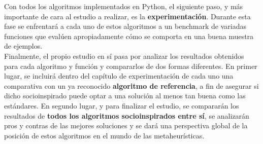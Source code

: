 Con todos los algoritmos implementados en Python, el siguiente paso, y más importante de cara al estudio a realizar, es la \textbf{experimentación}. Durante esta fase se enfrentará a cada uno de estos algoritmos a un benchmark de variadas funciones que evalúen apropiadamente cómo se comporta en una buena muestra de ejemplos.\\

Finalmente, el propio estudio en sí pasa por analizar los resultados obtenidos para cada algoritmo y función y compararlos de dos formas diferentes. En primer lugar, se incluirá dentro del capítulo de experimentación de cada uno una comparativa con un ya reconocido \textbf{algoritmo de referencia}, a fin de asegurar si dicho socioinspirado puede optar a una solución al menos tan buena como las estándares. En segundo lugar, y para finalizar el estudio, se compararán los resultados de \textbf{todos los algoritmos socioinspirados entre sí}, se analizarán pros y contras de las mejores soluciones y se dará una perspectiva global de la posición de estos algoritmos en el mundo de las metaheurísticas.
